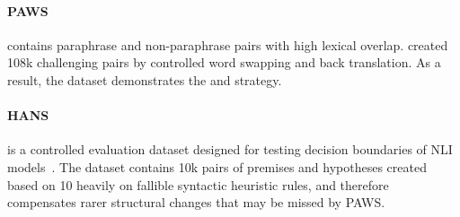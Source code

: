 \paragraph{PAWS} contains paraphrase and non-paraphrase pairs with high lexical overlap. 
\citet{zhang2019paws} created 108k challenging pairs by controlled word swapping and back translation.
As a result, the dataset demonstrates the  and  strategy.


\paragraph{HANS} is a controlled evaluation dataset designed for testing decision boundaries of NLI models~\cite{mccoy2019right}. 
The dataset contains 10k pairs of premises and hypotheses created based on 10 heavily on fallible syntactic heuristic rules, and therefore compensates rarer structural changes that may be missed by PAWS.